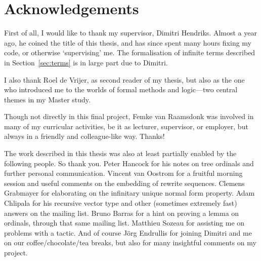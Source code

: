 \chapter*{Acknowledgements}
\thispagestyle{empty}

First of all, I would like to thank my supervisor, Dimitri
Hendriks. Almost a year ago, he coined the title of this thesis, and
has since spent many hours fixing my \Coq code, or otherwise
`supervising' me. The formalisation of infinite terms described in
Section~\ref{sec:terms} is in large part due to Dimitri.

I also thank Roel de Vrijer, as second reader of my thesis, but also
as the one who introduced me to the worlds of formal methods and
logic---two central themes in my Master study.

Though not directly in this final project, Femke van Raamsdonk was
involved in many of my curricular activities, be it as lecturer,
supervisor, or employer, but always in a friendly and colleague-like
way. Thanks!

The work described in this thesis was also at least partially enabled
by the following people. So thank you. Peter Hancock for his notes on
tree ordinals and further personal communication. Vincent van Oostrom
for a fruitful morning session and useful comments on the embedding of
rewrite sequences. Clemens Grabmayer for elaborating on the infinitary
unique normal form property. Adam Chlipala for his recursive vector type and
other (sometimes extremely fast) answers on the \Coq mailing
list. Bruno Barras for a hint on proving a lemma on ordinals, through
that same mailing list. Matthieu Sozeau for assisting me on problems
with a \Coq tactic. And of course J\"org Endrullis for joining Dimitri
and me on our coffee/chocolate/tea breaks, but also for many insightful
comments on my project.

